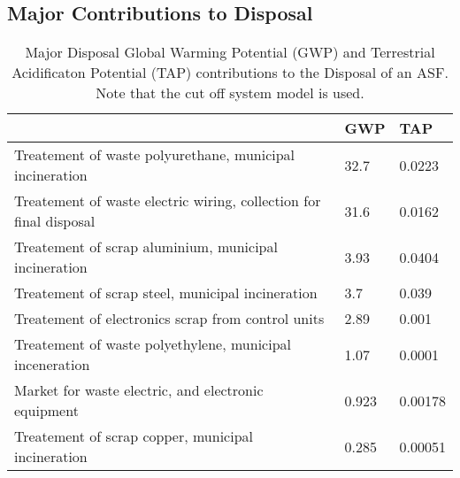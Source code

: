 \subsection{Major Contributions to Disposal}
\begin{landscape}
\begin{table}[H]
\begin{tabular}{lll}

\hline
                                                                   & GWP   & TAP     \\
\hline                                                                
Treatement of waste polyurethane, municipal incineration           & 32.7  & 0.0223  \\
Treatement of waste electric wiring, collection for final disposal & 31.6  & 0.0162  \\
Treatement of scrap aluminium, municipal incineration              & 3.93  & 0.0404  \\
Treatement of scrap steel, municipal incineration                  & 3.7   & 0.039   \\
Treatement of electronics scrap from control units                 & 2.89  & 0.001   \\
Treatement of waste polyethylene, municipal inceneration           & 1.07  & 0.0001  \\
Market for waste electric, and electronic equipment                & 0.923 & 0.00178 \\
Treatement of scrap copper, municipal incineration                 & 0.285 & 0.00051 \\
\hline
\end{tabular}
\caption{Major Disposal Global Warming Potential (GWP) and Terrestrial Acidificaton Potential (TAP) contributions to the Disposal of an ASF. Note that the cut off system model is used.}
\label{tab:dispEmssions}
\end{table}
\end{landscape}